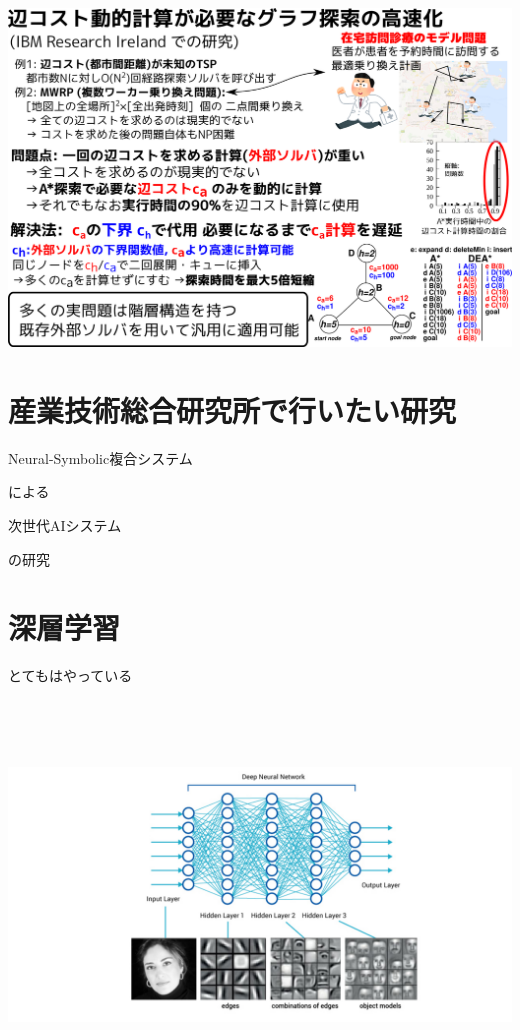 \includegraphics{img/ijcai17.png}

\section{産業技術総合研究所で行いたい研究}
\label{sec:orgheadline27}

\begin{xlarge}
Neural-Symbolic複合システム
\end{xlarge}
による
\begin{xlarge}
\begin{center}
次世代AIシステム
\end{center}
\begin{alignright}
の研究
\end{alignright}
\end{xlarge}

\section{深層学習}
\label{sec:orgheadline33}

とてもはやっている

　

　

\includegraphics{img/deeplearning/1.png}

